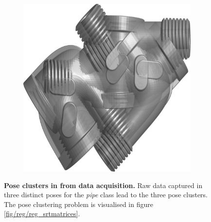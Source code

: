 \begin{figure}[ht]
\begin{subfigure}[b]{0.30\linewidth}
		\includegraphics[width=\linewidth]{fig/reg/cluster3.png}
	\end{subfigure}
	\caption{\textbf{Pose clusters in from data acquisition.} Raw data captured in three distinct poses for the \emph{pipe} class lead to the three pose clusters. The pose clustering problem is visualised in figure \ref{fig/reg/reg_srtmatrices}.}
	\label{fig/reg/3dclusters}
\end{figure}


